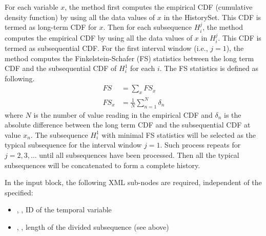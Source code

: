 For each variable $x$, the method first computes the empirical CDF (cumulative density function) by using all the data values of $x$ in the HistorySet. This CDF is termed as long-term CDF for $x$. Then for each subsequence $H_i^j$, the method computes the empirical CDF by using all the data values of $x$ in $H_i^j$. This CDF is termed as subsequential CDF. For the first interval window (i.e., $j=1$), the method computes the Finkelstein-Schafer (FS) statistics \cite{finkelstein1971improved} between the long term CDF and the subsequential CDF of $H_i^1$ for each $i$. The FS statistics is defined as following.
\begin{align*}
FS & = \sum_x FS_x\\
FS_x &= \frac{1}{N}\sum_{n=1}^N\delta_n
\end{align*}
where $N$ is the number of value reading in the empirical CDF and $\delta_n$ is the absolute difference between the long term CDF and the subsequential CDF at value $x_n$. The subsequence $H_i^1$ with minimal FS statistics will be selected as the typical subsequence for the interval window $j=1$. Such process repeats for $j=2,3,\dots$ until all subsequences have been processed. Then all the typical subsequences will be concatenated to form a complete history.

In the  input block, the following XML sub-nodes are required,
independent of the  specified:

\begin{itemize}
   \item {}, , ID of the temporal variable
   \item {}, , length of the divided subsequence (see above)
\end{itemize}

%
%

